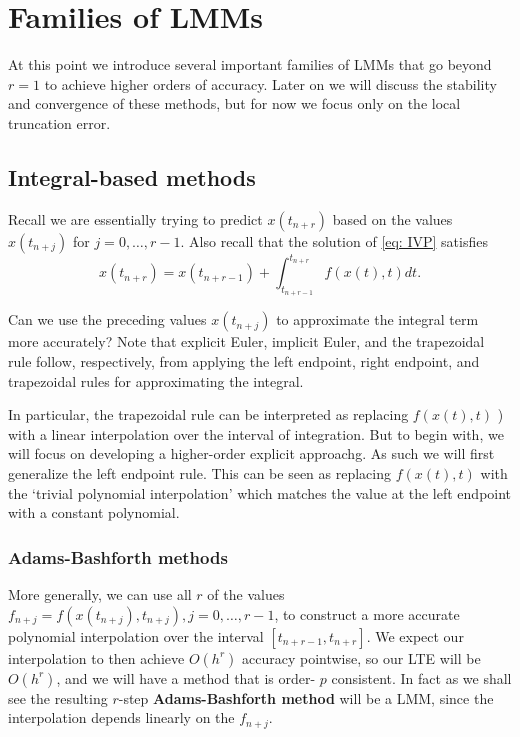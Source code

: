 \chapter{Families of LMMs}

At this point we introduce several important families of LMMs that go beyond $r=1$ to achieve higher orders of accuracy. Later on we will discuss the stability and convergence of these methods, but for now we focus only on the local truncation error.

\section{Integral-based methods} 
Recall we are essentially trying to predict $x\left(t_{n+r}\right)$ based on the values $x\left(t_{n+j}\right)$ for $j= 0, \ldots, r-1$. Also recall that the solution of \eqref{eq: IVP} satisfies
\begin{equation}
\label{eq: Solu to IVP}
    x\left(t_{n+r}\right)=x\left(t_{n+r-1}\right)+\int_{t_{n+r-1}}^{t_{n+r}} f(x(t), t) d t .
\end{equation}

Can we use the preceding values $x\left(t_{n+j}\right)$ to approximate the integral term more accurately? Note that explicit Euler, implicit Euler, and the trapezoidal rule follow, respectively, from applying the left endpoint, right endpoint, and trapezoidal rules for approximating the integral.

In particular, the trapezoidal rule can be interpreted as replacing $f(x(t), t)$ ) with a linear interpolation over the interval of integration. But to begin with, we will focus on developing a higher-order explicit approachg. As such we will first generalize the left endpoint rule. This can be seen as replacing $f(x(t), t)$ with the `trivial polynomial interpolation' which matches the value at the left endpoint with a constant polynomial.

\subsection{Adams-Bashforth methods} 
More generally, we can use all $r$ of the values $f_{n+j}=f\left(x\left(t_{n+j}\right), t_{n+j}\right), j=0, \ldots, r-1$, to construct a more accurate polynomial interpolation over the interval $\left[t_{n+r-1}, t_{n+r}\right]$. We expect our interpolation to then achieve $O\left(h^r\right)$ accuracy pointwise, so our LTE will be $O\left(h^{r}\right)$, and we will have a method that is order- $p$ consistent. In fact as we shall see the resulting $r$-step \textbf{Adams-Bashforth method} will be a LMM, since the interpolation depends linearly on the $f_{n+j}$.

